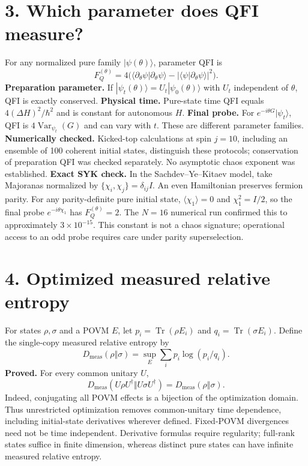 \documentclass[11pt,a4paper]{article}
\DeclareMathOperator{\Tr}{Tr}
\DeclareMathOperator{\Var}{Var}
\begin{document}
\section*{3. Which parameter does QFI measure?}
For any normalized pure family $|\psi(\theta)\rangle$, parameter QFI is
\[F_Q^{(\theta)}=4\bigl(\langle\partial_\theta\psi|\partial_\theta\psi\rangle-|\langle\psi|\partial_\theta\psi\rangle|^2\bigr).\]
\textbf{Preparation parameter.} If $|\psi_t(\theta)\rangle=U_t|\psi_0(\theta)\rangle$ with $U_t$ independent of $\theta$, QFI is exactly conserved. \textbf{Physical time.} Pure-state time QFI equals $4(\Delta H)^2/\hbar^2$ and is constant for autonomous $H$. \textbf{Final probe.} For $e^{-i\theta G}|\psi_t\rangle$, QFI is $4\Var_{\psi_t}(G)$ and can vary with $t$. These are different parameter families.
\textbf{Numerically checked.} Kicked-top calculations at spin $j=10$, including an ensemble of 100 coherent initial states, distinguish these protocols; conservation of preparation QFI was checked separately. No asymptotic chaos exponent was established.
\textbf{Exact SYK check.} In the Sachdev--Ye--Kitaev model, take Majoranas normalized by $\{\chi_i,\chi_j\}=\delta_{ij}I$. An even Hamiltonian preserves fermion parity. For any parity-definite pure initial state, $\langle\chi_1\rangle=0$ and $\chi_1^2=I/2$, so the final probe $e^{-i\theta\chi_1}$ has $F_Q^{(\theta)}=2$. The $N=16$ numerical run confirmed this to approximately $3\times10^{-15}$. This constant is not a chaos signature; operational access to an odd probe requires care under parity superselection.

\section*{4. Optimized measured relative entropy}
For states $\rho,\sigma$ and a POVM $E$, let $p_i=\Tr(\rho E_i)$ and $q_i=\Tr(\sigma E_i)$. Define the single-copy measured relative entropy by
\[D_{\mathrm{meas}}(\rho\Vert\sigma)=\sup_E\sum_i p_i\log(p_i/q_i).\]
\textbf{Proved.} For every common unitary $U$,
\[D_{\mathrm{meas}}(U\rho U^\dagger\Vert U\sigma U^\dagger)=D_{\mathrm{meas}}(\rho\Vert\sigma).\]
Indeed, conjugating all POVM effects is a bijection of the optimization domain. Thus unrestricted optimization removes common-unitary time dependence, including initial-state derivatives wherever defined. Fixed-POVM divergences need not be time independent. Derivative formulas require regularity; full-rank states suffice in finite dimension, whereas distinct pure states can have infinite measured relative entropy.
\end{document}

